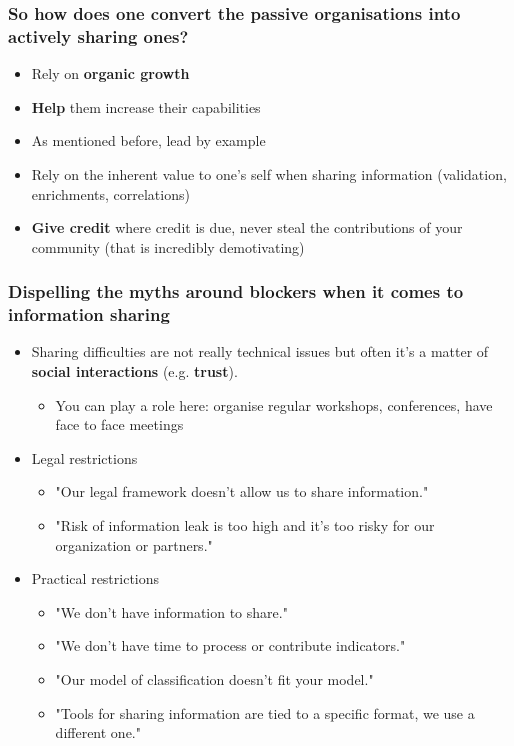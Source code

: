 \begin{frame}
\frametitle{So how does one convert the passive organisations into actively sharing ones?}
\begin{itemize}
    \item Rely on {\bf organic growth}
    \item {\bf Help} them increase their capabilities
	\item As mentioned before, lead by example
	\item Rely on the inherent value to one's self when sharing information (validation, enrichments, correlations)
    \item {\bf Give credit} where credit is due, never steal the contributions of your community (that is incredibly demotivating)
\end{itemize}
\end{frame}

\begin{frame}
\frametitle{Dispelling the myths around blockers when it comes to information sharing}
        \begin{itemize}
                \item Sharing difficulties are not really technical issues but often it's a matter of {\bf social interactions} (e.g. {\bf trust}).
		\begin{itemize}
			\item You can play a role here: organise regular workshops, conferences, have face to face meetings
		\end{itemize}
                \item Legal restrictions
                        \begin{itemize}
                                \item "Our legal framework doesn't allow us to share information."
                                \item "Risk of information leak is too high and it's too risky for our organization or partners."
                        \end{itemize}
                \item Practical restrictions
                        \begin{itemize}
                                \item "We don't have information to share."
                                \item "We don't have time to process or contribute indicators."
                                \item "Our model of classification doesn't fit your model."
                                \item "Tools for sharing information are tied to a specific format, we use a different one."
                        \end{itemize}
        \end{itemize}
\end{frame}

